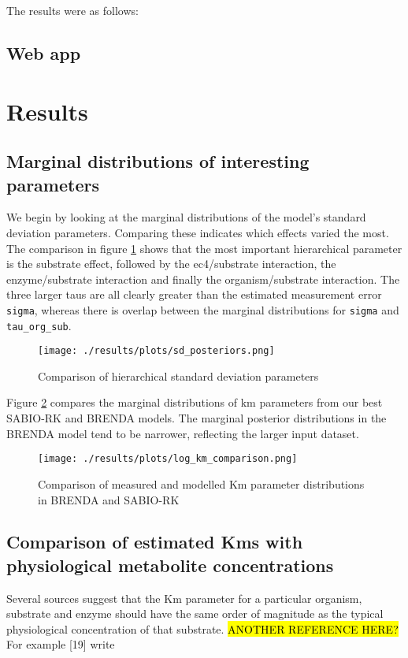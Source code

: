 \documentclass[11pt]{article}
\makeatletter
\newcommand{\citeprocitem}[2]{\hyper@linkstart{cite}{citeproc_bib_item_#1}#2\hyper@linkend}
\makeatother
\begin{document}
The results were as follows:

\subsection{Web app}
\label{sec:orga822afd}
\section{Results}
\label{sec:org5aba7b0}
\subsection{Marginal distributions of interesting parameters}
\label{sec:orga6687c0}
We begin by looking at the marginal distributions of the model's standard
deviation parameters. Comparing these indicates which effects varied the
most. The comparison in figure \ref{fig:org186a847} shows that the most important
hierarchical parameter is the substrate effect, followed by the ec4/substrate
interaction, the enzyme/substrate interaction and finally the organism/substrate
interaction. The three larger taus are all clearly greater than the estimated
measurement error \texttt{sigma}, whereas there is overlap between the marginal
distributions for \texttt{sigma} and \texttt{tau\_org\_sub}.

\begin{figure}[htbp]
\centering
\texttt{[image: ./results/plots/sd\_posteriors.png]}
\caption{\label{fig:org186a847}Comparison of hierarchical standard deviation parameters}
\end{figure}

Figure \ref{fig:orgd13462e} compares the marginal distributions of km
parameters from our best SABIO-RK and BRENDA models. The marginal posterior
distributions in the BRENDA model tend to be narrower, reflecting the larger
input dataset.

\begin{figure}[htbp]
\centering
\texttt{[image: ./results/plots/log\_km\_comparison.png]}
\caption{\label{fig:orgd13462e}Comparison of measured and modelled Km parameter distributions in BRENDA and SABIO-RK}
\end{figure}

\subsection{Comparison of estimated Kms with physiological metabolite concentrations}
\label{sec:org7a2d906}
Several sources suggest that the Km parameter for a particular organism,
substrate and enzyme should have the same order of magnitude as the typical
physiological concentration of that substrate. \hl{ANOTHER REFERENCE HERE?} For example
\citeprocitem{19}{[19]} write
\end{document}
